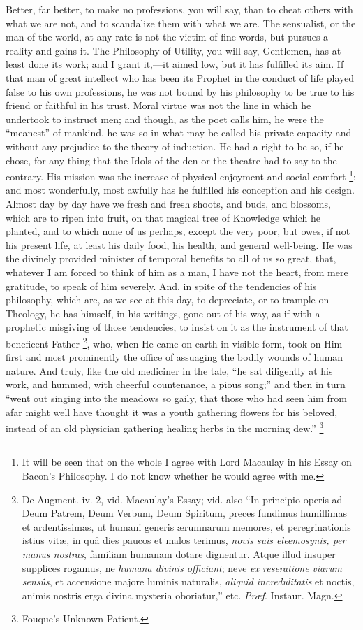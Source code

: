 Better, far better, to make no professions, you will say, than to
cheat others with what we are not, and to scandalize them with what we
are. The sensualist, or the man of the world, at any rate is not the
victim of fine words, but pursues a reality and gains it. The
Philosophy of Utility, you will say, Gentlemen, has at least done its
work; and I grant it,—it aimed low, but it has fulfilled its aim. If
that man of great intellect who has been its Prophet in the conduct of
life played false to his own professions, he was not bound by his
philosophy to be true to his friend or faithful in his trust. Moral
virtue was not the line in which he undertook to instruct men; and
though, as the poet calls him, he were the ``meanest''
of mankind, he was so in what may be called his private capacity and
without any prejudice to the theory of induction. He had a right to be
so, if he chose, for any thing that the Idols of the den or the
theatre had to say to the contrary. His mission was the increase of
physical enjoyment and social comfort \footnote{It will be seen
that on the whole I agree with Lord Macaulay in his Essay on Bacon's
Philosophy. I do not know whether he would agree with me.}; and most wonderfully, most awfully has he fulfilled his
conception and his design. Almost day by day have we fresh and fresh
shoots, and buds, and blossoms, which are to ripen into fruit, on that
magical tree of Knowledge which he planted, and to which none of us
perhaps, except the very poor, but owes, if not his present life, at
least his daily food, his health, and general well-being. He was the
divinely provided minister of temporal benefits to all of us so great,
that, whatever I am forced to think of him as a man, I have not the
heart, from mere gratitude, to speak of him severely. And, in spite of
the tendencies of his philosophy, which are, as we see at this day, to
depreciate, or to trample on Theology, he has himself, in his
writings, gone out of his way, as if with a prophetic misgiving of
those tendencies, to insist on it as the instrument of that beneficent
Father \footnote{De Augment. iv.
2, vid. Macaulay's Essay; vid. also ``In principio operis ad Deum
Patrem, Deum Verbum, Deum Spiritum, preces fundimus humillimas et
ardentissimas, ut humani generis ærumnarum memores, et
peregrinationis istius vitæ, in quâ dies paucos et malos terimus, \emph{novis suis eleemosynis, per manus nostras}, familiam humanam
dotare dignentur. Atque illud insuper supplices rogamus, ne \emph{humana
divinis officiant}; neve \emph{ex reseratione} \emph{viarum sensûs},
et accensione majore luminis naturalis, \emph{aliquid incredulitatis}
et noctis, animis nostris erga divina mysteria oboriatur,'' etc. \emph{Præf}.
Instaur. Magn.}, who, when He came on earth in visible form, took on Him first
and most prominently the office of assuaging the bodily wounds
of human nature. And truly, like the old mediciner in the tale,
``he sat diligently at his work, and hummed, with cheerful
countenance, a pious song;'' and then in turn ``went out
singing into the meadows so gaily, that those who had seen him from
afar might well have thought it was a youth gathering flowers for his
beloved, instead of an old physician gathering healing herbs in the
morning dew.'' \footnote{Fouque's
Unknown Patient.}

